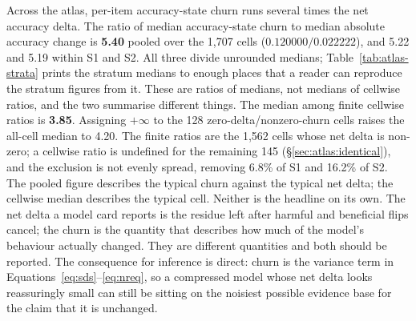 Across the atlas, per-item accuracy-state churn runs several times the net
accuracy delta. The ratio of median accuracy-state churn to median absolute
accuracy change is \textbf{5.40} pooled over the 1{,}707 cells
($0.120000 / 0.022222$), and 5.22 and 5.19 within S1 and S2. All three divide
unrounded medians; Table~\ref{tab:atlas-strata} prints the stratum medians to
enough places that a reader can reproduce the stratum figures from it. These
are ratios of medians, not medians of cellwise ratios, and the two
summarise different things. The median among finite cellwise ratios is
\textbf{3.85}. Assigning $+\infty$ to the 128 zero-delta/nonzero-churn cells
raises the all-cell median to 4.20. The finite ratios are the 1{,}562 cells
whose net delta is non-zero; a cellwise ratio is undefined for the remaining 145
(\S\ref{sec:atlas:identical}), and the exclusion is not evenly spread, removing
6.8\% of S1 and 16.2\% of S2. The pooled figure describes the typical churn
against the typical net delta; the cellwise median describes the typical cell.
Neither is the headline on its own.
The net delta a model card reports is the residue left after
harmful and beneficial flips cancel; the churn is the quantity that describes how
much of the model's behaviour actually changed. They are different quantities and
both should be reported. The consequence for inference is direct: churn is the
variance term in Equations~\eqref{eq:sds}--\eqref{eq:nreq}, so a compressed model
whose net delta looks reassuringly small can still be sitting on the noisiest
possible evidence base for the claim that it is unchanged.

